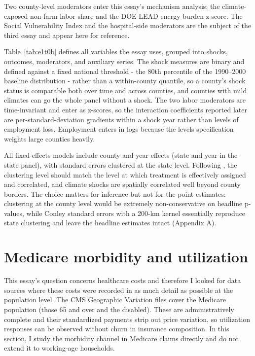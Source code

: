 \documentclass[a4paper,11pt]{article}
\begin{document}


Two county-level moderators enter this essay's mechanism analysis: the climate-exposed non-farm labor share and the DOE LEAD energy-burden z-score. The Social Vulnerability Index and the hospital-side moderators are the subject of the third essay and appear here for reference.

Table~\ref{tab:e1t0b} defines all variables the essay uses, grouped into shocks, outcomes, moderators, and auxiliary series. The shock measures are binary and defined against a fixed national threshold - the 80th percentile of the 1990--2000 baseline distribution - rather than a within-county quantile, so a county's shock status is comparable both over time and across counties, and counties with mild climates can go the whole panel without a shock. The two labor moderators are time-invariant and enter as z-scores, so the interaction coefficients reported later are per-standard-deviation gradients within a shock year rather than levels of employment loss. Employment enters in logs because the levels specification weights large counties heavily.

All fixed-effects models include county and year effects (state and year in the state panel), with standard errors clustered at the state level. Following \citet{abadie2023clustering}, the clustering level should match the level at which treatment is effectively assigned and correlated, and climate shocks are spatially correlated well beyond county borders. The choice matters for inference but not for the point estimates: clustering at the county level would be extremely non-conservative on headline p-values, while Conley standard errors with a 200-km kernel essentially reproduce state clustering and leave the headline estimates intact (Appendix A). \citep{conley1999gmm}

\FloatBarrier
\section{Medicare morbidity and utilization}

This essay's question concerns healthcare costs and therefore I looked for data sources where these costs were recorded in as much detail as possible at the population level. The CMS Geographic Variation files cover the Medicare population (those 65 and over and the disabled). These are administratively complete and their standardized payments strip out price variation, so utilization responses can be observed without churn in insurance composition. In this section, I study the morbidity channel in Medicare claims directly and do not extend it to working-age households.
\end{document}
